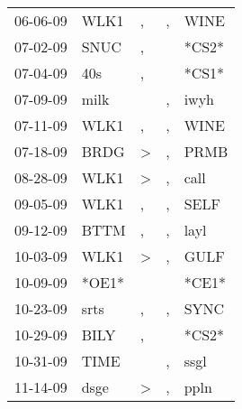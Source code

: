 \begin{supertabular}{p{0.07\textwidth}p{0.06\textwidth}p{0.02\textwidth}p{0.02\textwidth}p{0.06\textwidth}}
          06-06-09\textsuperscript{} &  WLK1\textsuperscript{} &                , &             , &           WINE\textsuperscript{} \\
          07-02-09\textsuperscript{} &  SNUC\textsuperscript{} &                , &               &                            *CS2* \\
          07-04-09\textsuperscript{} &   40s\textsuperscript{} &                , &               &                            *CS1* \\
          07-09-09\textsuperscript{} &  milk\textsuperscript{} &                  &             , &           iwyh\textsuperscript{} \\
          07-11-09\textsuperscript{} &  WLK1\textsuperscript{} &                , &             , &           WINE\textsuperscript{} \\
          07-18-09\textsuperscript{} &  BRDG\textsuperscript{} &     \textgreater &             , &           PRMB\textsuperscript{} \\
          08-28-09\textsuperscript{} &  WLK1\textsuperscript{} &     \textgreater &             , &           call\textsuperscript{} \\
          09-05-09\textsuperscript{} &  WLK1\textsuperscript{} &                , &             , &           SELF\textsuperscript{} \\
          09-12-09\textsuperscript{} &  BTTM\textsuperscript{} &                , &             , &           layl\textsuperscript{} \\
          10-03-09\textsuperscript{} &  WLK1\textsuperscript{} &     \textgreater &             , &           GULF\textsuperscript{} \\
          10-09-09\textsuperscript{} &                   *OE1* &                  &               &                            *CE1* \\
          10-23-09\textsuperscript{} &  srts\textsuperscript{} &                , &             , &           SYNC\textsuperscript{} \\
          10-29-09\textsuperscript{} &  BILY\textsuperscript{} &                , &               &                            *CS2* \\
          10-31-09\textsuperscript{} &  TIME\textsuperscript{} &                  &             , &           ssgl\textsuperscript{} \\
          11-14-09\textsuperscript{} &  dsge\textsuperscript{} &     \textgreater &             , &           ppln\textsuperscript{} \\

\end{supertabular}
